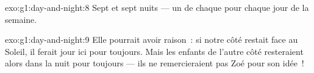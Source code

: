 \begin{solution}{exo:g1:day-and-night:8}
Sept  et sept nuits --- un de chaque pour chaque jour
de la semaine.
\end{solution}

\begin{solution}{exo:g1:day-and-night:9}
Elle pourrait avoir raison~: si notre côté restait face au Soleil, il
ferait jour ici pour toujours. Mais les enfants de l'autre côté
resteraient alors dans la nuit pour toujours --- ils ne remercieraient
pas Zoé pour son idée~!
\end{solution}
